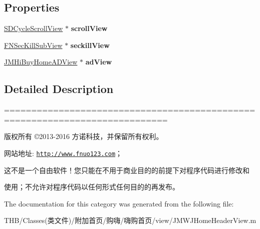 \subsection*{Properties}
\begin{DoxyCompactItemize}
\item 
\mbox{\label{category_j_m_w_j_home_header_view_07_08_aae6fc6095d5d1f63a350e49520c47459}} 
\mbox{\hyperlink{interface_s_d_cycle_scroll_view}{S\+D\+Cycle\+Scroll\+View}} $\ast$ {\bfseries scroll\+View}
\item 
\mbox{\label{category_j_m_w_j_home_header_view_07_08_a80bb2bdea3369c5978ff6aefe77e310e}} 
\mbox{\hyperlink{interface_f_n_sec_kill_sub_view}{F\+N\+Sec\+Kill\+Sub\+View}} $\ast$ {\bfseries seckill\+View}
\item 
\mbox{\label{category_j_m_w_j_home_header_view_07_08_ae213f47362e554c6f01288a5e96e5474}} 
\mbox{\hyperlink{interface_j_m_hi_buy_home_a_d_view}{J\+M\+Hi\+Buy\+Home\+A\+D\+View}} $\ast$ {\bfseries ad\+View}
\end{DoxyCompactItemize}


\subsection{Detailed Description}
============================================================================

版权所有 ©2013-\/2016 方诺科技，并保留所有权利。

网站地址\+: \href{http://www.fnuo123.com}{\tt http\+://www.\+fnuo123.\+com}； 



这不是一个自由软件！您只能在不用于商业目的的前提下对程序代码进行修改和

使用；不允许对程序代码以任何形式任何目的的再发布。 

 

The documentation for this category was generated from the following file\+:\begin{DoxyCompactItemize}
\item 
T\+H\+B/\+Classes(类文件)/附加首页/购嗨/嗨购首页/view/J\+M\+W\+J\+Home\+Header\+View.\+m\end{DoxyCompactItemize}
